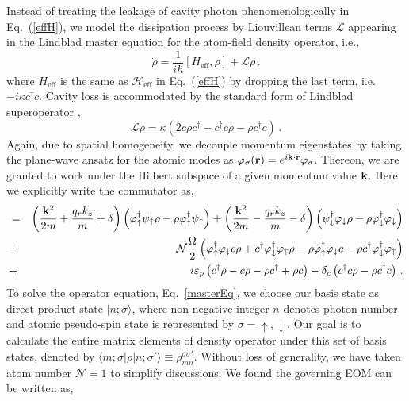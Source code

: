 \documentclass[atoms,article,submit,moreauthors,pdftex,12pt,a4paper]{mdpi}
\def\be{\begin{equation}}
\def\ee{\end{equation}}
\def\ba{\begin{eqnarray}}
\def\ea{\end{eqnarray}}
\begin{document}
Instead of treating the leakage of cavity photon phenomenologically in Eq.~(\ref{effH}), we model the dissipation process by Liouvillean terms $\mathcal{L}$ appearing in the Lindblad master equation for the atom-field density operator, i.e., 
\be 
\dot{\rho} = \frac{1}{i\hbar}[H_{\text{eff}},\rho]+\mathcal{L}\rho \,. \label{masterEq}
\ee
where $H_{\text{eff}}$ is the same as $\mathcal{H}_{\text{eff}}$ in Eq.~(\ref{effH}) by dropping the last term, i.e. $-i\kappa c^{\dagger}c$. Cavity loss is accommodated by the standard form of Lindblad superoperator \cite{L1, L2},
\be 
\mathcal{L}\rho = \kappa (2c\rho c^\dagger-c^\dagger c\rho-\rho c^\dagger c)\,.\label{Lindblad}
\ee
Again, due to spatial homogeneity, we decouple momentum eigenstates by taking the plane-wave ansatz for the atomic modes as $\varphi_\sigma({\bf r})=e^{i{\bf k}\cdot{\bf r}}\varphi_\sigma$. Thereon, we are granted to work under the Hilbert subspace of a given momentum value ${\bf k}$. Here we explicitly write the commutator as,
\ba
[H_{\text{eff}}({\bf k}),\rho] & = & \left(\frac{{\bf k}^{2}}{2m}+\frac{q_{r}k_{z}}{m}+\delta\right)\left(\varphi_{\uparrow}^{\dagger}\psi_{\uparrow}\rho-\rho\varphi_{\uparrow}^{\dagger}\psi_{\uparrow}\right)+\left(\frac{{\bf k}^{2}}{2m}-\frac{q_{r}k_{z}}{m}-\delta\right)\left(\psi_{\downarrow}^{\dagger}\varphi_{\downarrow}\rho-\rho\varphi_{\downarrow}^{\dagger}\varphi_{\downarrow}\right)\nonumber\\
 & + & \mathcal{N}\frac{\Omega}{2}\left(\varphi_{\uparrow}^{\dagger}\varphi_{\downarrow}c\rho+c^{\dagger}\varphi_{\downarrow}^{\dagger}\varphi_{\uparrow}\rho-\rho\varphi_{\uparrow}^{\dagger}\varphi_{\downarrow}c-\rho c^{\dagger}\varphi_{\downarrow}^{\dagger}\varphi_{\uparrow}\right)\nonumber\\
&+&i\varepsilon_{p}\left(c^{\dagger}\rho-c\rho-\rho c^{\dagger}+\rho c\right)-\delta_{c}\left(c^{\dagger}c\rho-\rho c^{\dagger}c\right)\,.
\ea
To solve the operator equation, Eq.~\ref{masterEq}, we choose our basis state as direct product state $|n;\sigma\rangle$, %
where non-negative integer $n$ denotes photon number 
and atomic pseudo-spin state is represented by $\sigma=\uparrow,\downarrow$. Our goal is to calculate the entire matrix elements of density operator under this set of basis states, denoted by $\langle m;\sigma|\rho|n;\sigma'\rangle\equiv\rho_{mn}^{\sigma\sigma'}$. Without loss of generality, we have taken atom number $\mathcal{N}=1$ to simplify discussions. We found the governing EOM can be written as,
\end{document}
